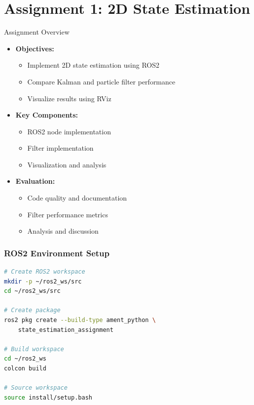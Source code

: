 \documentclass[aspectratio=169]{beamer}
\begin{document}
\section{Assignment 1: 2D State Estimation}

\begin{frame}{Assignment Overview}
    \begin{itemize}
        \item<1-> \textbf{Objectives:}
            \begin{itemize}
                \item Implement 2D state estimation using ROS2
                \item Compare Kalman and particle filter performance
                \item Visualize results using RViz
            \end{itemize}
        \item<2-> \textbf{Key Components:}
            \begin{itemize}
                \item ROS2 node implementation
                \item Filter implementation
                \item Visualization and analysis
            \end{itemize}
        \item<3-> \textbf{Evaluation:}
            \begin{itemize}
                \item Code quality and documentation
                \item Filter performance metrics
                \item Analysis and discussion
            \end{itemize}
    \end{itemize}
\end{frame}

\begin{frame}[fragile]
\frametitle{ROS2 Environment Setup}
\begin{lstlisting}[language=bash]
# Create ROS2 workspace
mkdir -p ~/ros2_ws/src
cd ~/ros2_ws/src

# Create package
ros2 pkg create --build-type ament_python \
    state_estimation_assignment

# Build workspace
cd ~/ros2_ws
colcon build

# Source workspace
source install/setup.bash
\end{lstlisting}
\end{frame}
\end{document}
